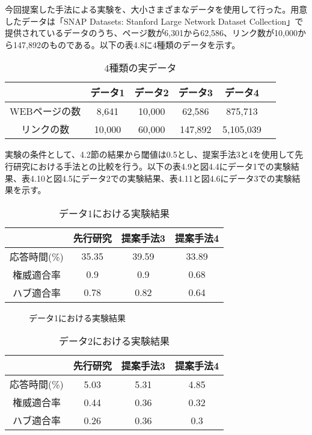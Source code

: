 \documentclass[a4paper,11pt]{jreport}
\begin{document}
今回提案した手法による実験を、大小さまざまなデータを使用して行った。用意したデータは「SNAP Datasets: Stanford Large Network Dataset Collection」で提供されているデータのうち、ページ数が6,301から62,586、リンク数が10,000から147,892のものである。以下の表4.8に4種類のデータを示す。

\begin{table}[htb]
\begin{center}
\caption{4種類の実データ}
\begin{tabular}{|c||c|c|c|c|c|} \hline
    & データ1 & データ2 & データ3 & データ4 \\ \hline \hline
    WEBページの数 & 8,641 & 10,000 & 62,586 & 875,713 \\ \hline
    リンクの数 & 10,000 & 60,000 & 147,892 & 5,105,039 \\  \hline
\end{tabular}
\end{center}
\end{table}

実験の条件として、4.2節の結果から閾値は0.5とし、提案手法3と4を使用して先行研究における手法との比較を行う。以下の表4.9と図4.4にデータ1での実験結果、表4.10と図4.5にデータ2での実験結果、表4.11と図4.6にデータ3での実験結果を示す。

\begin{table}[htb]
\begin{center}
\caption{データ1における実験結果}
\begin{tabular}{|c||c|c|c|} \hline 
    & 先行研究 & 提案手法3 & 提案手法4 \\ \hline \hline
    応答時間(\%) & 35.35 & 39.59 & 33.89 \\  \hline
    権威適合率 & 0.9 & 0.9 & 0.68 \\ \hline
    ハブ適合率 & 0.78 & 0.82 & 0.64 \\ \hline
\end{tabular}
\end{center}
\end{table}

\begin{figure}[htbp]
\begin{center}
\end{center}
\caption{データ1における実験結果}
\label{figure:sample}
\end{figure}

\begin{table}[htb]
\begin{center}
\caption{データ2における実験結果}
\begin{tabular}{|c||c|c|c|} \hline 
    & 先行研究 & 提案手法3 & 提案手法4 \\ \hline \hline
    応答時間(\%) & 5.03 & 5.31 & 4.85 \\  \hline
    権威適合率 & 0.44 & 0.36 & 0.32 \\ \hline
    ハブ適合率 & 0.26 & 0.36 & 0.3 \\ \hline
\end{tabular}
\end{center}
\end{table}
\end{document}
